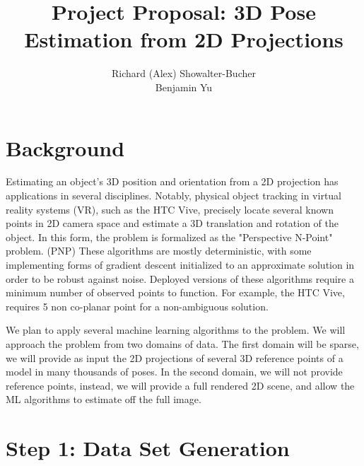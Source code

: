 \documentclass[journal]{IEEEtran}
\begin{document}
%
\title{Project Proposal: 3D Pose Estimation from 2D Projections}
%
%
%

\author{Richard (Alex) Showalter-Bucher\\Benjamin Yu}


\maketitle

\section{Background}
Estimating an object's 3D position and orientation from a 2D projection has applications in several disciplines.
Notably, physical object tracking in virtual reality systems (VR), such as the HTC Vive, precisely locate several
known points in 2D camera space and estimate a 3D translation and rotation of the object. In this form, the
problem is formalized as the "Perspective N-Point" problem. (PNP) These algorithms are mostly deterministic,
with some implementing forms of gradient descent initialized to an approximate solution in order to be robust
against noise. Deployed versions of these algorithms require a minimum number of observed points to function.
For example, the HTC Vive, requires 5 non co-planar point for a non-ambiguous solution.

We plan to apply several machine learning algorithms to the problem. We will approach the problem from two
domains of data. The first domain will be sparse, we will provide as input the 2D projections of several 3D reference
points of a model in many thousands of poses. In the second domain, we will not provide reference points, instead,  we
will provide a full rendered 2D scene, and allow the ML algorithms to estimate off the full image.

\section{Step 1: Data Set Generation}
\end{document}
